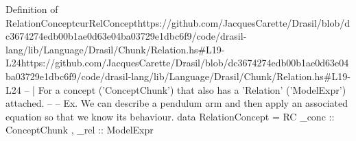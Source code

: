 \begin{haskell}{Definition of RelationConcept}{curRelConcept}{https://github.com/JacquesCarette/Drasil/blob/dc3674274edb00b1ae0d63e04ba03729e1dbc\linebreak{}6f9/code/drasil-lang/lib/Language/Drasil/Chunk/Relation.hs\#L19-L24}{https://github.com/JacquesCarette/Drasil/blob/dc3674274edb00b1ae0d63e04ba03729e1dbc6f9/code/drasil-lang/lib/Language/Drasil/Chunk/Relation.hs\#L19-L24}
-- | For a concept ('ConceptChunk') that also has a 'Relation' ('ModelExpr') attached.
--
-- Ex. We can describe a pendulum arm and then apply an associated equation so that we know its behaviour.
data RelationConcept = RC { _conc :: ConceptChunk
                          , _rel  :: ModelExpr
                          }
\end{haskell}
